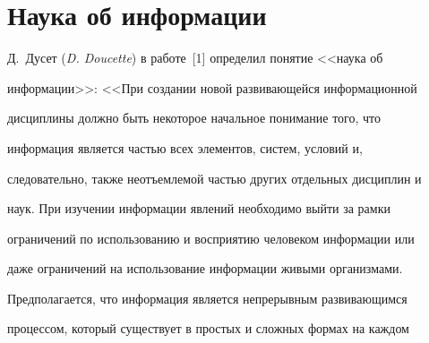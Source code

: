 












      \thispagestyle{headings}





      


            \label{st\stat}


            


            \vspace*{-9pt}











\section{Наука об информации}





   Д.~Дусет (\textit{D. Doucette}) в работе~[1] определил понятие <<наука об 


информации>>: <<При создании новой развивающейся информационной 


дисциплины должно быть некоторое начальное понимание того, что 


информация является частью всех элементов, систем, условий и, 


следовательно, также неотъемлемой частью других отдельных дисциплин и 


наук. При изучении информации явлений необходимо выйти за рамки 


ограничений по использованию и восприятию человеком информации или 


даже ограничений на использование информации живыми организмами.


   


   Предполагается, что информация является непрерывным развивающимся 


процессом, который существует в простых и сложных формах на каждом 


